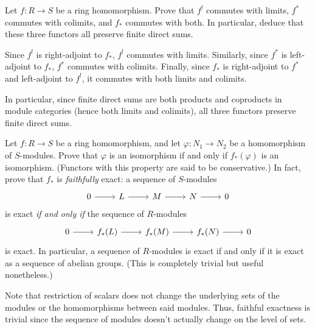 \documentclass[../../master.tex]{subfiles}
\begin{document}
\begin{problem}
    Let $f: R \to S$ be a ring homomorphism.
    Prove that $f^{!}$ commutes with limits, $f^{*}$ commutes with colimits, and $f_{*}$ commutes with both.
    In particular, deduce that these three functors all preserve finite direct sums.
\end{problem}

\begin{solution}
    Since $f^{!}$ is right-adjoint to $f_{*}$, $f^{!}$ commutes with limits.
    Similarly, since $f^{*}$ is left-adjoint to $f_{*}$, $f^{*}$ commutes with colimits.
    Finally, since $f_{*}$ is right-adjoint to $f^{*}$ and left-adjoint to $f^{!}$, it commutes with both limits and colimits.

    In particular, since finite direct sums are both products and coproducts in module categories (hence both limits and colimits), all three functors preserve finite direct sums.
\end{solution}

\begin{problem}
    Let $f: R \to S$ be a ring homomorphism, and let $\varphi : N_1 \to N_2$ be a homomorphism of $S$-modules.
    Prove that $\varphi$ is an isomorphism if and only if $f_{*}(\varphi)$ is an isomorphism.
    (Functors with this property are said to be conservative.)
    In fact, prove that $f_{*}$ is \textit{faithfully} exact:
    a sequence of $S$-modules
    \[
    \begin{tikzcd}
        0 & L & M & N & 0
        \arrow[from=1-1, to=1-2] 
        \arrow[from=1-2, to=1-3] 
        \arrow[from=1-3, to=1-4] 
        \arrow[from=1-4, to=1-5] 
    \end{tikzcd}
    \]
    is exact \textit{if and only if} the sequence of $R$-modules
    \[
    \begin{tikzcd}
        0 & f_{*}(L) & f_{*}(M) & f_{*}(N) & 0
        \arrow[from=1-1, to=1-2] 
        \arrow[from=1-2, to=1-3] 
        \arrow[from=1-3, to=1-4] 
        \arrow[from=1-4, to=1-5] 
    \end{tikzcd}
    \]
    is exact.
    In particular, a sequence of $R$-modules is exact if and only if it is exact as a sequence of abelian groups.
    (This is completely trivial but useful nonetheless.)
\end{problem}

\begin{solution}
    Note that restriction of scalars does not change the underlying sets of the modules or the homomorphisms between said modules.
    Thus, faithful exactness is trivial since the sequence of modules doesn't actually change on the level of sets.
\end{solution}
\end{document}
